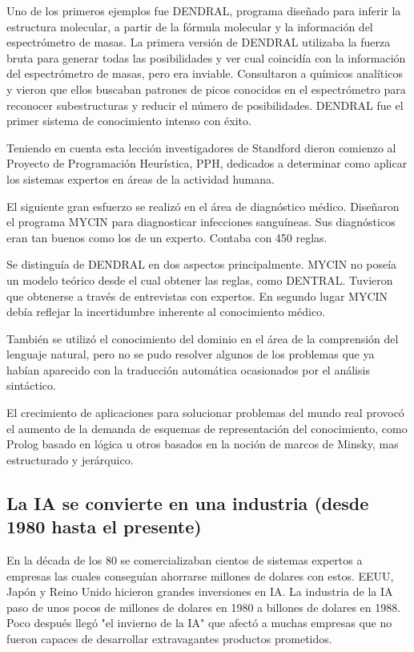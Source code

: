 \documentclass[12pt,a4paper]{article}
\begin{document}
Uno de los primeros ejemplos fue DENDRAL, programa diseñado para inferir la estructura molecular, a partir de la fórmula molecular y la información del espectrómetro de masas. La primera versión de DENDRAL utilizaba la fuerza bruta para generar todas las posibilidades y ver cual coincidía con la información del espectrómetro de masas, pero era inviable. Consultaron a químicos analíticos y vieron que ellos buscaban patrones de picos conocidos en el espectrómetro para reconocer subestructuras y reducir el número de posibilidades. DENDRAL fue el primer sistema de conocimiento intenso con éxito.

Teniendo en cuenta esta lección investigadores de Standford dieron comienzo al Proyecto de Programación Heurística, PPH, dedicados a determinar como aplicar los sistemas expertos en áreas de la actividad humana.

El siguiente gran esfuerzo se realizó en el área de diagnóstico médico. Diseñaron el programa MYCIN para diagnosticar infecciones sanguíneas. Sus diagnósticos eran tan buenos como los de un experto. Contaba con 450 reglas.

Se distinguía de DENDRAL en dos aspectos principalmente. MYCIN no poseía un modelo teórico desde el cual obtener las reglas, como DENTRAL. Tuvieron que obtenerse a través de entrevistas con expertos. En segundo lugar MYCIN debía reflejar la incertidumbre inherente al conocimiento médico.

También se utilizó el conocimiento del dominio en el área de la comprensión del lenguaje natural, pero no se pudo resolver algunos de los problemas que ya habían aparecido con la traducción automática ocasionados por el análisis sintáctico.

El crecimiento de aplicaciones para solucionar problemas del mundo real provocó el aumento de la demanda de esquemas de representación del conocimiento, como Prolog basado en lógica u otros basados en la noción de marcos de Minsky, mas estructurado y jerárquico.

\subsection{La IA se convierte en una industria (desde 1980 hasta el presente)}

En la década de los 80 se comercializaban cientos de sistemas expertos a empresas las cuales conseguían ahorrarse millones de dolares con estos. EEUU, Japón y Reino Unido hicieron grandes inversiones en IA. La industria de la IA paso de unos pocos de millones de dolares en 1980 a billones de dolares en 1988. Poco después llegó "el invierno de la IA" que afectó a muchas empresas que no fueron capaces de desarrollar extravagantes productos prometidos.
\end{document}
